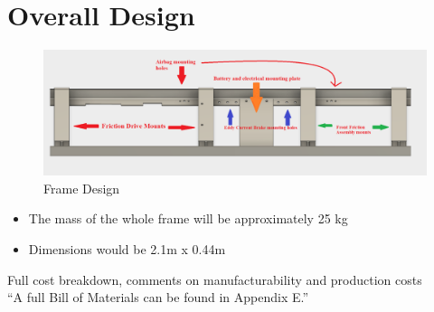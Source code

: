\documentclass[main.tex]{subfiles}
\begin{document}
    \section{Overall Design}
    \begin{figure}
        \centering
        \includegraphics[width=\linewidth]{images/fig24}
        \caption{Frame Design}
        \label{fig:frame-design}
    \end{figure}
    \begin{itemize}
        \item The mass of the whole frame will be approximately 25 kg
        \item Dimensions would be 2.1m x 0.44m
    \end{itemize}
    Full cost breakdown, comments on manufacturability and production costs\\
    “A full Bill of Materials can be found in Appendix E.”
\end{document}
